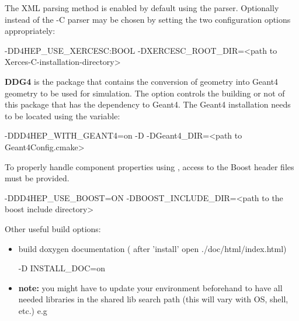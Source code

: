 \documentclass[10pt,a4paper]{article}
\begin{document}
\noindent
The XML parsing method is enabled by default using the  parser. Optionally 
instead of  the -C  parser may be chosen by setting the 
two configuration options appropriately:

\begin{unnumberedcode}
    -DD4HEP_USE_XERCESC:BOOL
    -DXERCESC_ROOT_DIR=<path to Xerces-C-installation-directory>
\end{unnumberedcode}

\noindent
{\bf{DDG4}} is the package that contains the conversion of \DDhep geometry 
into Geant4 geometry to be used for simulation. 
The option  controls the building or not of 
this package that has the dependency to Geant4. The Geant4 installation 
needs to be located using the variable:

\begin{unnumberedcode}
   -DDD4HEP_WITH_GEANT4=on -D 
   -DGeant4_DIR=<path to Geant4Config.cmake>
\end{unnumberedcode}

\noindent
To properly handle component properties using , 
access to the Boost header files must be provided.
\vspace{0.3cm}
\begin{unnumberedcode}
    -DDD4HEP_USE_BOOST=ON 
    -DBOOST_INCLUDE_DIR=<path to the boost include directory>
\end{unnumberedcode}

\noindent
Other useful build options:
\begin{itemize}
\item build doxygen documentation ( after 'install' open ./doc/html/index.html)
\begin{unnumberedcode}
    -D INSTALL_DOC=on 
\end{unnumberedcode}
 
\item {\bf{note:}} you might have to update your environment beforehand to have all needed 
     libraries in the shared lib search path (this will vary with OS, shell, etc.) e.g 
\end{itemize}
\end{document}
